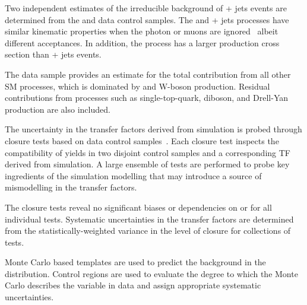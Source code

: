 Two independent estimates of the irreducible background of \znunu +
jets events are determined from the \gj and \mmj data control samples.
The \gj and \zmumu + jets processes have similar kinematic properties
when the photon or muons are ignored~\cite{Bern:2011pa} albeit
different acceptances. In addition, the \gj process has a larger
production cross section than \znunu + jets events.

The \mj data sample provides an estimate for the total
contribution from all other SM processes, which is dominated by \ttbar
and W-boson production. Residual contributions from processes such as
single-top-quark, diboson, and Drell-Yan production are also included.

The uncertainty in the transfer factors derived from simulation is
probed through closure tests based on data control
samples~\cite{RA1Paper2012}. Each closure test inspects the
compatibility of yields in two disjoint control samples and a corresponding TF
derived from simulation. A large ensemble of tests are performed to
probe key ingredients of the simulation modelling that may introduce a
source of mismodelling in the transfer factors.

The closure tests reveal no significant biases or dependencies on
\njet or \scalht for all individual tests. Systematic uncertainties in
the transfer factors are determined from the statistically-weighted
variance in the level of closure for collections of
tests.

Monte Carlo based templates are used to predict the background in the \mht distribution. Control regions are used to evaluate the degree to which the Monte Carlo describes the variable in data and assign appropriate systematic uncertainties.

